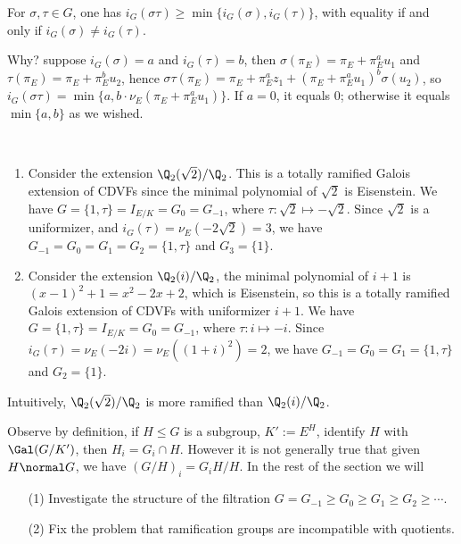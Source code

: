 \documentclass[11pt]{amsart}
\begin{document}
\begin{remark}
    For $\sigma, \tau \in G$, one has $i_G(\sigma \tau) \geq \min\{i_G(\sigma),
    i_G(\tau)\}$, with equality if and only if $i_G(\sigma) \neq i_G(\tau)$.

    Why? suppose $i_G(\sigma) = a$ and $i_G(\tau) = b$, then $\sigma(\pi_E) =
    \pi_E + \pi_E^a u_1$ and $\tau(\pi_E) = \pi_E + \pi_E^b u_2$, hence $\sigma
    \tau(\pi_E) = \pi_E + \pi_E^a z_1 + (\pi_E + \pi_E^a u_1)^b \sigma(u_2)$, so
    $i_{G}(\sigma \tau) = \min \{a, b \cdot \nu_E(\pi_E + \pi_E^a u_1)\}$.  If
    $a = 0$, it equals $0$; otherwise it equals $\min\{a, b\}$ as we wished.
\end{remark}

\begin{example}~
    \begin{enumerate}
        \item Consider the extension $\Q_2(\sqrt{2})/\Q_2$.  This is a totally
            ramified Galois extension of CDVFs since the minimal polynomial of
            $\sqrt{2}$ is Eisenstein. We have $G = \{1, \tau\} = I_{E/K} = G_{0}
            = G_{-1}$, where $\tau : \sqrt{2} \mapsto -\sqrt{2}$.  Since
            $\sqrt{2}$ is a uniformizer, and $i_G(\tau) = \nu_E(-2\sqrt{2}) =
            3$, we have $G_{-1} = G_{0} = G_1 = G_2 = \{1, \tau\}$ and $G_3 =
            \{1\}$.

        \item Consider the extension $\Q_2(i)/\Q_2$, the minimal polynomial of
            $i + 1$ is $(x-1)^2 + 1 = x^2 - 2x + 2$, which is Eisenstein, so
            this is a totally ramified Galois extension of CDVFs with
            uniformizer $i + 1$.  We have $G = \{1, \tau\} = I_{E/K} = G_{0} =
            G_{-1}$, where $\tau : i \mapsto -i$.  Since $i_G(\tau) = \nu_E(-2i)
            = \nu_E((1 + i)^2) = 2$, we have $G_{-1} = G_0 = G_1 = \{1, \tau\}$
            and $G_2 = \{1\}$.
    \end{enumerate}
    Intuitively, $\Q_2(\sqrt{2})/\Q_2$ is more ramified than $\Q_2(i)/\Q_2$.
\end{example}

\medbreak

Observe by definition, if $H \leq G$ is a subgroup, $K' := E^H$, identify $H$
with $\Gal(G/K')$, then $H_i = G_i \cap H$.  However it is not generally true
that given $H \normal G$, we have $(G/H)_i = G_iH/H$.  In the rest of the
section we will

\begin{enumerate}
    \item[(1)] Investigate the structure of the filtration $G = G_{-1} \geq G_0
        \geq G_1 \geq G_2 \geq \cdots$.
    \item[(2)] Fix the problem that ramification groups are incompatible with
        quotients.
\end{enumerate}
\end{document}
